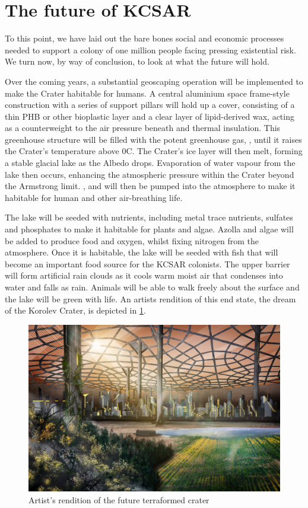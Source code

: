 \documentclass[fleqn,10pt]{Stylesheet} %
\begin{document}
\section{The future of KCSAR}
To this point, we have laid out the bare bones social and economic processes needed to support a colony of one million people facing pressing existential risk. We turn now, by way of conclusion, to look at what the future will hold. 

Over the coming years, a substantial geoscaping operation will be implemented to make the Crater habitable for humans. A central aluminium space frame-style construction with a series of support pillars will hold up a cover, consisting of a thin PHB or other bioplastic layer and a clear layer of lipid-derived wax, acting as a counterweight to the air pressure beneath and thermal insulation. This greenhouse structure will be filled with the potent greenhouse gas, , until it raises the Crater's temperature above 0\degree{}C. The Crater’s ice layer will then melt, forming a stable glacial lake as the Albedo drops. Evaporation of water vapour from the lake then occurs, enhancing the atmospheric pressure within the Crater beyond the Armstrong limit.  ,  and  will then be pumped into the atmosphere to make it habitable for human and other air-breathing life.

The lake will be seeded with nutrients, including metal trace nutrients, sulfates and phosphates to make it habitable for plants and algae. Azolla and algae will be added to produce food and oxygen, whilst fixing nitrogen from the atmosphere. Once it is habitable, the lake will be seeded with fish that will become an important food source for the KCSAR colonists. The upper barrier will form artificial rain clouds as it cools warm moist air that condenses into water and falls as rain. Animals will be able to walk freely about the surface and the lake will be green with life. An artists rendition of this end state, the dream of the Korolev Crater, is depicted in \ref{fig:final_dome}.

\begin{figure}
    \centering
    \includegraphics[width=\linewidth]{art/terraformed_dome.jpg}
    \caption{Artist's rendition of the future terraformed crater}
    \label{fig:final_dome}
\end{figure}
\end{document}
